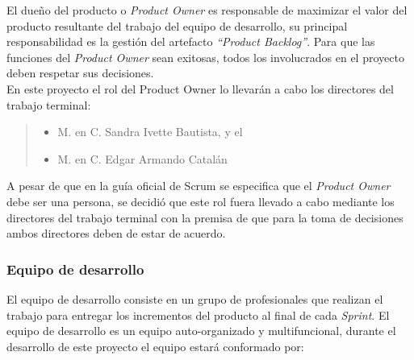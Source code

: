  El dueño del producto o {\em Product Owner} es responsable de maximizar el valor del producto
 resultante del trabajo del equipo de desarrollo, su principal responsabilidad es la gestión
 del artefacto {\em``Product Backlog''}. Para que las funciones del {\it Product Owner} sean exitosas,
 todos los involucrados en el proyecto deben respetar sus decisiones.\\

 \noindent En este proyecto el rol del Product Owner lo llevarán a cabo los directores del trabajo terminal:
     
    \begin{quote}
    \begin{itemize}
        \item M. en C. Sandra Ivette Bautista, y el
        \item M. en C. Edgar Armando Catalán
    \end{itemize}
    \end{quote}
                                         
 \noindent A pesar de que en la guía oficial de Scrum \cite{Sutherland17} se especifica que el {\it Product
 Owner} debe ser una persona, se decidió que este rol fuera llevado a cabo mediante los directores del trabajo
 terminal con la premisa de que para la toma de decisiones ambos directores deben de estar de acuerdo.

\subsubsection{Equipo de desarrollo}

 El equipo de desarrollo consiste en un grupo de profesionales que realizan el trabajo para entregar
 los incrementos del producto al final de cada {\it Sprint}. El equipo de desarrollo es un equipo
 auto-organizado y multifuncional, durante el desarrollo de este proyecto el equipo estará conformado por:


